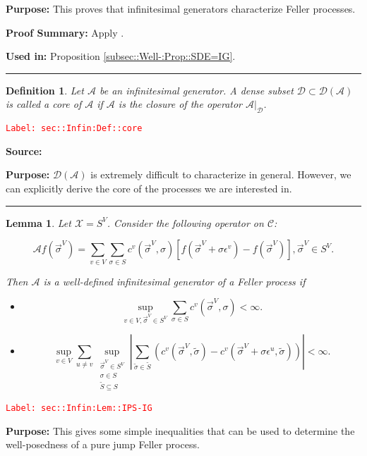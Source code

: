 \documentclass[12pt]{article}
\newcommand{\mc}{\mathcal}
\newcommand{\ep}{\epsilon}
\newcommand{\tr}{\textcolor{red}}
\newcommand{\labe}[1]{\tr{\texttt{Label: #1}}}
\newcommand{\purpose}{\textbf{Purpose: }}
\newcommand{\pfsum}{\textbf{Proof Summary: }}
\newcommand{\usein}{\textbf{Used in: }}
\newcommand{\lin}{\rule{\linewidth}{0.4 pt}}
\renewcommand{\v}{v}							%
\newcommand{\vv}{u}								%
\renewcommand{\S}{S}							%
\newcommand{\s}{\sigma}							%
\newcommand{\sv}{\vec{\s}}						%
\newcommand{\ev}{\ep}							%
\newcommand{\IG}{\mc{A}}						%
\newcommand{\IGr}{c}							%
\newcommand{\vind}[1]{^{#1}}					%
\newcommand{\carp}[1]{^{#1}}					%
\newcommand{\vsi}[1]{^{#1}}						%
\newcommand{\core}{\mc{D}}						%
\newcommand{\cont}{\mc{C}}						%
\renewcommand{\ss}{\tilde{\s}}					%
\renewcommand{\SS}{\tilde{\S}}					%
\newcommand{\spce}{\mc{X}}						%
\newtheorem{lem}[thms]{Lemma}
\newtheorem{defn}[thms]{Definition}
\begin{document}
\purpose This proves that infinitesimal generators characterize Feller processes.

\pfsum Apply \cite[Theorem 1.5,2.9]{Lig85}.

\usein Proposition \ref{subsec::Well-:Prop::SDE=IG}.

\lin

\begin{defn}
Let \(\IG\) be an infinitesimal generator. A dense subset \(\core\subset \core(\IG)\) is called a core of \(\IG\) if \(\IG\) is the closure of the operator \(\IG|_\core\).
\label{sec::Infin:Def::core}
\end{defn}
\labe{sec::Infin:Def::core}

\textbf{Source: }\cite[Definition 2.11]{Lig85}

\purpose \(\core(\IG)\) is extremely difficult to characterize in general. However, we can explicitly derive the core of the processes we are interested in.

\lin

\begin{lem}
Let \(\spce = \S\carp{V}\). Consider the following operator on \(\cont\):

\[\IG f(\sv\vsi{V}) = \sum_{v \in V}\sum_{\s\in \S} \IGr\vind{\v}(\sv\vsi{V},\s)[f(\sv\vsi{V} + \s\ev\vind{\v}) - f(\sv\vsi{V})], \sv\vsi{V} \in \S\carp{V}.\]

Then \(\IG\) is a well-defined infinitesimal generator of a Feller process if

\begin{itemize}
\item 

\[\sup_{\v \in V,\sv\vsi{V} \in \S\carp{V}} \sum_{\s \in \S} \IGr\vind{\v}(\sv\vsi{V},\s) < \infty.\]

\item 

\[\sup_{\v\in V}\sum_{\vv\neq \v} \sup_{\substack{\sv\vsi{V} \in \S\carp{V}\\ \s\in \S\\ \SS \subseteq \S}} \left|\sum_{\ss \in \SS} (\IGr\vind{\v}(\sv\vsi{V},\ss) - \IGr\vind{\v}(\sv\vsi{V}+\s \ev\vind{\vv},\ss))\right| < \infty.\]
\end{itemize}
\label{sec::Infin:Lem::IPS-IG}
\end{lem}
\labe{sec::Infin:Lem::IPS-IG}

\purpose This gives some simple inequalities that can be used to determine the well-posedness of a pure jump Feller process. 
\end{document}
